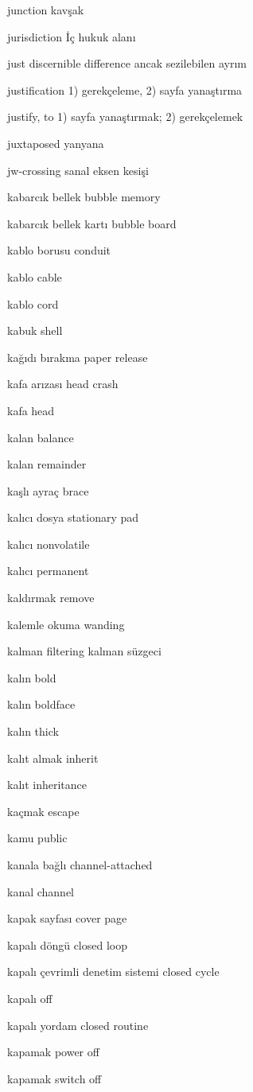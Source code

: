 \documentclass[12pt,fleqn]{article}\usepackage{../../common}
\begin{document}
junction kavşak

jurisdiction İç hukuk alanı

just discernible difference ancak sezilebilen ayrım

justification 1) gerekçeleme, 2) sayfa yanaştırma

justify, to 1) sayfa yanaştırmak; 2) gerekçelemek

juxtaposed yanyana

jw-crossing sanal eksen kesişi

kabarcık bellek bubble memory

kabarcık bellek kartı bubble board

kablo borusu conduit

kablo cable

kablo cord

kabuk shell

kağıdı bırakma paper release

kafa arızası head crash

kafa head

kalan balance

kalan remainder

kaşlı ayraç brace

kalıcı dosya stationary pad

kalıcı nonvolatile

kalıcı permanent

kaldırmak remove

kalemle okuma wanding

kalman filtering kalman süzgeci

kalın bold

kalın boldface

kalın thick

kalıt almak inherit

kalıt inheritance

kaçmak escape

kamu public

kanala bağlı channel-attached

kanal channel

kapak sayfası cover page

kapalı döngü closed loop

kapalı çevrimli denetim sistemi closed cycle

kapalı off

kapalı yordam closed routine

kapamak power off

kapamak switch off
\end{document}
